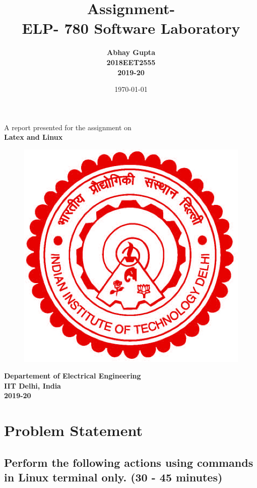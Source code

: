 \documentclass[12pt,a4paper]{article}
\author{\textbf{Abhay Gupta} \\ \textbf{2018EET2555}\\ \textbf{2019-20}}
\date{\today}
\title{\textbf{Assignment-\\ELP- 780 Software  Laboratory}}
\begin{document}
	\maketitle
	
	\begin{center}
	\noindent \large{{A report presented for the assignment on \\ \textbf{Latex and Linux} }}
	\vspace{1cm}
	
	\begin{figure}[h]
	\centering
	\includegraphics[scale=.2]{iitd.jpg}
	\end{figure}
	\vspace{1.5cm}
	
	\textbf{Departement of Electrical Engineering\\IIT Delhi, India \\ 2019-20}
	
	\end{center}
	
	\newpage
	\tableofcontents
	\listoffigures
	\newpage
	
	\section{Problem Statement}
	
	
		\subsection*{Perform the following actions using commands in Linux terminal only. (30 - 45 minutes)}
		
\end{document}
